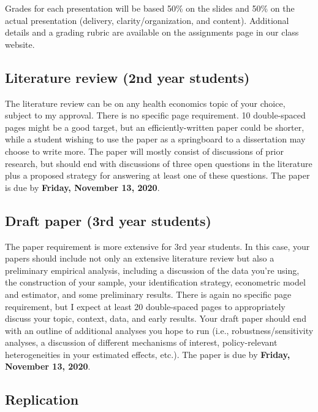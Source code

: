 \documentclass[11pt,]{article}
\begin{document}
Grades for each presentation will be based 50\% on the slides and 50\%
on the actual presentation (delivery, clarity/organization, and
content). Additional details and a grading rubric are available on the
assignments page in our class website.

\hypertarget{literature-review-2nd-year-students}{%
\subsection{Literature review (2nd year
students)}\label{literature-review-2nd-year-students}}

The literature review can be on any health economics topic of your
choice, subject to my approval. There is no specific page requirement.
10 double-spaced pages might be a good target, but an
efficiently-written paper could be shorter, while a student wishing to
use the paper as a springboard to a dissertation may choose to write
more. The paper will mostly consist of discussions of prior research,
but should end with discussions of three open questions in the
literature plus a proposed strategy for answering at least one of these
questions. The paper is due by \textbf{Friday, November 13, 2020}.

\hypertarget{draft-paper-3rd-year-students}{%
\subsection{Draft paper (3rd year
students)}\label{draft-paper-3rd-year-students}}

The paper requirement is more extensive for 3rd year students. In this
case, your papers should include not only an extensive literature review
but also a preliminary empirical analysis, including a discussion of the
data you're using, the construction of your sample, your identification
strategy, econometric model and estimator, and some preliminary results.
There is again no specific page requirement, but I expect at least 20
double-spaced pages to appropriately discuss your topic, context, data,
and early results. Your draft paper should end with an outline of
additional analyses you hope to run (i.e., robustness/sensitivity
analyses, a discussion of different mechanisms of interest,
policy-relevant heterogeneities in your estimated effects, etc.). The
paper is due by \textbf{Friday, November 13, 2020}.

\hypertarget{replication}{%
\subsection{Replication}\label{replication}}
\end{document}
